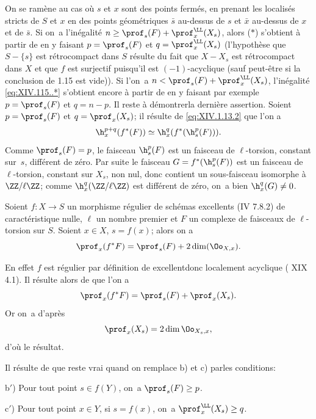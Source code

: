 On se ram\`ene au cas o\`u $s$ et $x$ sont des points ferm\'es, en prenant les localis\'es stricts de $S$ et $x$ en des points g\'eom\'etriques $\bar s$ au-dessus de $s$ et $\bar x$ au-dessus de $x$ et de $\bar s$. Si on~a l'in\'egalit\'e $n\geq\prof_s(F)+\prof_x^\LL(X_s)$, alors ($*$) s'obtient \`a partir de  en y faisant $p=\prof_s(F)$ et $q=\prof_x^\LL(X_s)$ (l'hypoth\`ese que $S-\{s\}$ est r\'etrocompact dans $S$ r\'esulte du fait que $X-X_s$ est r\'etrocompact dans $X$ et que $f$ est surjectif puisqu'il est $(-1)$-acyclique (sauf peut-\^etre si la conclusion de 1.15 est vide)). Si l'on~a $n<\prof_s(F)+\prof_x^\LL(X_s)$, l'in\'egalit\'e \eqref{eq:XIV.115..*} s'obtient encore \`a partir de  en y faisant par exemple $p=\prof_s(F)$ et $q=n-p$. Il reste \`a d\'emontrer\pageoriginale la derni\`ere assertion. Soient $p=\prof_s(F)$ et $q=\prof_x(X_s)$; il r\'esulte de \eqref{eq:XIV.1.13.2} que l'on a
$$
\h_x^{p+q}(f^*(F))\simeq \h_x^q(f^*(\h^p_s(F))).
$$
Comme $\prof_s(F)=p$, le faisceau $\h^p_s(F)$ est un faisceau de $\ell$-torsion, constant sur~$s$, diff\'erent de z\'ero. Par suite le faisceau $G=f^*(\h_s^p(F))$ est un faisceau de $\ell$-torsion, constant sur $X_s$, non nul, donc contient un sous-faisceau isomorphe \`a $\ZZ/\ell\ZZ$; comme $\h_x^q(\ZZ/\ell\ZZ)$ est diff\'erent de z\'ero, on~a bien $\h_x^q(G)\neq 0$.

\begin{corollaire} \label{XIV.1.16}
Soient $f:X\to S$ un morphisme r\'egulier de sch\'emas excellents (\textup{\EGA IV 7.8.2}) de caract\'eristique nulle, $\ell$ un nombre premier et $F$ un complexe de faisceaux de $\ell$-torsion sur $S$. Soient $x\in X$, $s=f(x)$; alors on a
$$
\prof_x(f^*F)=\prof_s(F)+2\dim(\Oo_{X, x}).
$$
\end{corollaire}

En effet $f$ est r\'egulier par d\'efinition de \og excellent\fg donc localement acyclique ( XIX 4.1). Il r\'esulte alors de  que l'on a
$$
\prof_x(f^*F)=\prof_s(F)+\prof_x(X_s).
$$
Or on~a d'apr\`es 
$$
\prof_x(X_s)=2\dim\Oo_{X_s, x},
$$
d'o\`u le r\'esultat.

\begin{remarque} \label{XIV.1.17}
Il r\'esulte de  que  reste vrai quand on remplace b) et c) par\pageoriginale les conditions:

b$'$) Pour tout point $s\in f(Y)$, on~a $\prof_s(F)\geq p$.

c$'$) Pour tout point $x\in Y$, si $s=f(x)$, on~a $\prof^\LL_x(X_s)\geq q$.
\end{remarque}

